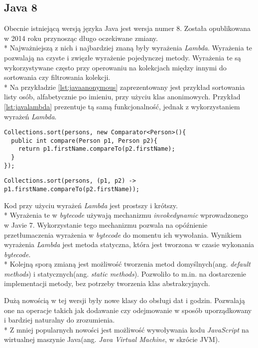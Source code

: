 \subsection{Java 8}
Obecnie istniejącą wersją języka Java jest wersja numer 8. Została opublikowana w 2014 roku przynosząc długo oczekiwane zmiany.\\*
Najważniejszą z nich i najbardziej znaną były wyrażenia \textsl{Lambda}. Wyrażenia te pozwalają na czyste i zwięzłe wyrażenie pojedynczej metody. Wyrażenia te są wykorzystywane często przy operowaniu na kolekcjach między innymi do sortowania czy filtrowania kolekcji.\\*
Na przykładzie \ref{lst:javaanonymous} zaprezentowany jest przykład sortowania listy osób, alfabetycznie po imieniu, przy użyciu klas anonimowych. Przykład \ref{lst:javalambda} prezentuje tą samą funkcjonalność, jednak z wykorzystaniem wyrażeń \textsl{Lambda}. 

\begin{lstlisting}[caption=Sortowanie kolekcji w języku Java przy użyciu klas anonimowych, label={lst:javaanonymous}]
Collections.sort(persons, new Comparator<Person>(){
  public int compare(Person p1, Person p2){
    return p1.firstName.compareTo(p2.firstName);
  }
});
\end{lstlisting}

\begin{lstlisting}[caption=Sortowanie kolekcji w języku Java przy użyciu wyrażeń \textsl{Lambda},label={lst:javalambda}, aboveskip=0mm]
Collections.sort(persons, (p1, p2) -> p1.firstName.compareTo(p2.firstName));
\end{lstlisting}
Kod przy użyciu wyrażeń \textsl{Lambda} jest prostszy i krótszy.\\*
Wyrażenia te w \textsl{bytecode} używają mechanizmu \textsl{invokedynamic} wprowadzonego w Javie 7. Wykorzystanie tego mechanizmu pozwala na opóźnienie przetłumaczenia wyrażenia w \textsl{bytecode} do momentu ich wywołania. Wynikiem wyrażenia \textsl{Lambda} jest metoda statyczna, która jest tworzona w czasie wykonania \textsl{bytecode}.\\*
Kolejną sporą zmianą jest możliwość tworzenia metod domyślnych(ang. \textsl{default methods}) i statycznych(ang. \textsl{static methods}). Pozwoliło to m.in. na dostarczenie implementacji metody, bez potrzeby tworzenia klas abstrakcyjnych.

Dużą nowością w tej wersji były nowe klasy do obsługi dat i godzin. Pozwalają one na operacje takich jak dodawanie czy odejmowanie w sposób uporządkowany i bardziej naturalny do zrozumienia.\\*
Z mniej popularnych nowości jest możliwość wywoływania kodu \textsl{JavaScript} na wirtualnej maszynie Java(ang. \textsl{Java Virtual Machine}, w skrócie JVM).


